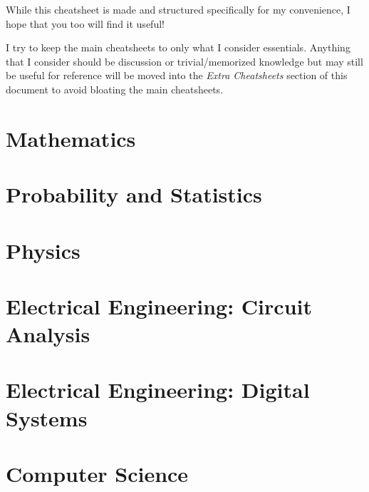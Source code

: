 \documentclass{article}
\begin{document}
\thispagestyle{plain}
\MakeCustomTitle
\bigskip

\medskip
While this cheatsheet is made and structured specifically for my convenience, I hope that you too will find it useful!

I try to keep the main cheatsheets to only what I consider essentials. Anything that I consider should be discussion or trivial/memorized knowledge but may still be useful for reference will be moved into the \textit{Extra Cheatsheets} section of this document to avoid bloating the main cheatsheets.
\medskip

{
    \hypersetup{linkcolor=black}
    \tableofcontents
}

\newpage
\section{Mathematics}
\label{sec:mathgeneral}

    {  }

\newpage
\section{Probability and Statistics}
\label{sec:probability-and-statistics}

    {  }

\newpage
\section{Physics}
\label{sec:physics}

    {  }

\newpage
\section{Electrical Engineering: Circuit Analysis}
\label{sec:ee-circuit-analysis}

    {  }

\newpage
\section{Electrical Engineering: Digital Systems}
\label{sec:ee-digital}

    {  }

\newpage
\section{Computer Science}
\label{sec:compsci}
\end{document}
